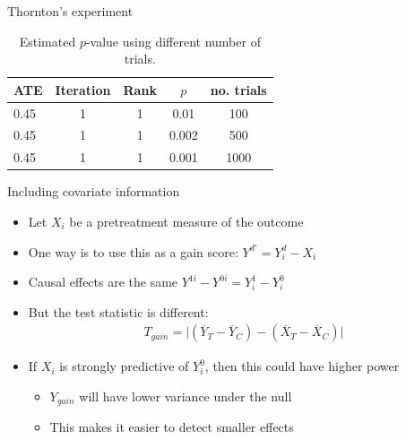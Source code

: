 \documentclass{beamer}
\begin{document}
\begin{frame}{Thornton's experiment}

\begin{table}[htbp]\small{}
\centering
\begin{tabular}{lcccc}
\toprule
ATE & Iteration & Rank & $p$ & no. trials \\
\midrule
0.45 	 & 1 & 1 & 0.01 & 100\\
0.45 	 & 1 & 1 & 0.002 & 500\\
0.45 	 & 1 & 1 & 0.001 & 1000\\
\bottomrule
\end{tabular}
\caption{Estimated $p$-value using different number of trials.}
\label{tab:starrandom}
\end{table}

\end{frame}

\begin{frame}{Including covariate information}

\begin{itemize}
\item Let $X_i$ be a pretreatment measure of the outcome
\item One way is to use this as a gain score: $Y^{d'} = Y_i^d - X_i$
\item Causal effects are the same $Y^{1i} - Y^{0i} = Y_i^1 - Y_i^0$
\item But the test statistic is different:
\begin{eqnarray*}
T_{gain} = \bigg | ( \overline{Y}_T - \overline{Y}_C ) - (\overline{X}_T - \overline{X}_C ) \bigg |
\end{eqnarray*}
\item If $X_i$ is strongly predictive of $Y_i^0$, then this could have higher power
	\begin{itemize}
	\item $Y_{gain}$ will have lower variance under the null
	\item This makes it easier to detect smaller effects
	\end{itemize}
\end{itemize}

\end{frame}
\end{document}
